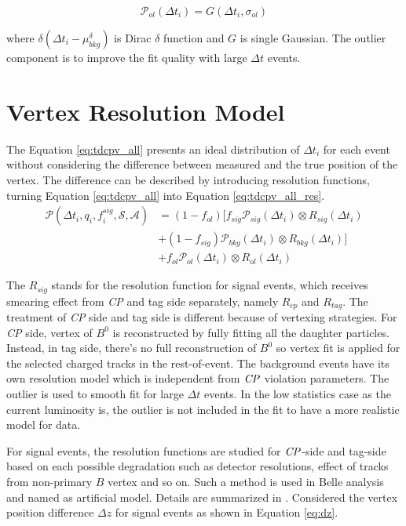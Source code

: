 \begin{equation}\label{eq:p_out}
\mathcal{P}_{ol} (\Delta t_i)=
G(\Delta t_i, \sigma_{ol})
\end{equation}

where $\delta(\Delta t_i-\mu_{bkg}^{\delta})$ is Dirac $\delta$ function and $G$ is single Gaussian. The outlier component is to improve the fit quality with large $\Delta t$ events.

\section{Vertex Resolution Model}

The Equation \ref{eq:tdcpv_all} presents an ideal distribution of $\Delta t_i$ for each event without considering the difference between measured and the true position of the vertex. The difference can be described by introducing resolution functions, turning Equation \ref{eq:tdcpv_all} into Equation \ref{eq:tdcpv_all_res}.
\begin{equation}\label{eq:tdcpv_all_res}
\begin{split}
\mathcal{P}(\Delta t_i,q_i,f_i^{sig},\mathcal{S},\mathcal{A})
&=(1-f_{ol})\text{[}f_{sig}\mathcal{P}_{sig}(\Delta t_i)\otimes R_{sig}(\Delta t_i)\\
&+(1-f_{sig})\mathcal{P}_{bkg}(\Delta t_i)\otimes R_{bkg}(\Delta t_i)
\text{]}\\
&+f_{ol}\mathcal{P}_{ol}(\Delta t_i)\otimes R_{ol}(\Delta t_i)
\end{split}
\end{equation}

The $R_{sig}$ stands for the resolution function for signal events, which receives smearing effect from \textit{CP} and tag side separately, namely $R_{cp}$ and  $R_{tag}$. The treatment of \textit{CP} side and tag side is different because of vertexing strategies. For \textit{CP} side, vertex of $B^0$ is reconstructed by fully fitting all the daughter particles. Instead, in tag side, there's no full reconstruction of $B^0$ so vertex fit is applied for the selected charged tracks in the rest-of-event. The background events have its own resolution model which is independent from  $\it{CP}$ violation parameters. The outlier is used to smooth fit for large $\Delta t$ events. In the low statistics case as the current luminosity is, the outlier is not included in the fit to have a more realistic model for data.

For signal events, the resolution functions are studied for $\it{CP}$-side and tag-side based on each possible degradation such as detector resolutions, effect of tracks from non-primary $B$ vertex and so on. Such a method is used in Belle analysis and named as artificial model. Details are summarized in \cite{Yusa-note}. Considered the vertex position difference $\Delta z$ for signal events as shown in Equation \ref{eq:dz}. 

